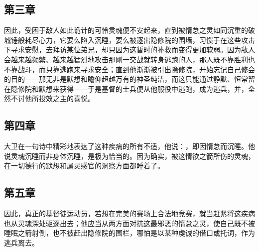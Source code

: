 
\subsection{第三章}

\par

因此，受困于敌人如此诡计的可怜灵魂便不安起来，直到被惰怠之灵如同沉重的破城锤般耗尽心力，它要么陷入沉睡，要么被逐出隐修院的围墙，习惯于在这些攻击下寻求安慰，去拜访某位弟兄，却只因为这暂时的补救而变得更加软弱。因为敌人会越来越频繁、越来越猛烈地攻击那刚一交战就转身逃跑的人，那人既不靠胜利也不靠战斗，而只靠逃跑来寻求安全；直到他渐渐被引出隐修院，开始忘记自己修会的目的——那无非是默想和瞻仰超越万有的神圣纯洁，而这只能通过静默、恒常留在隐修院和默想来获得——于是基督的士兵便从他服役中逃跑，成为逃兵，并，全然不讨他所投效之主的喜悦。\par


\subsection{第四章}

\par

大卫在一句诗中精彩地表达了这种疾病的所有不适，他说：，即因惰怠而沉睡。他说灵魂沉睡而非身体沉睡，是极为恰当的。因为确实，被这情欲之箭所伤的灵魂，在一切德行的默想和属灵感官的洞察方面都睡着了。\par


\subsection{第五章}

\par

因此，真正的基督徒运动员，若想在完美的赛场上合法地竞赛，就当赶紧将这疾病也从灵魂深处驱逐出去；他应当从两方面对抗这最邪恶的惰怠之灵，使自己既不被睡眠之箭射倒，也不被赶出隐修院的围栏，哪怕是以某种虔诚的借口或托词，作为逃兵离去。\par

